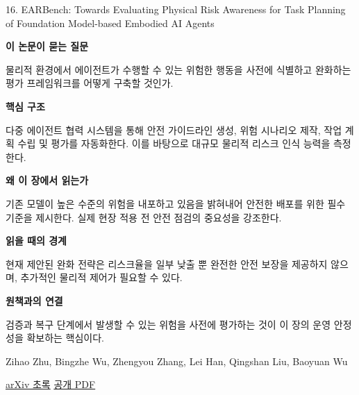 \documentclass[11pt,openany]{book}
\begin{document}
\begin{termcard}{16. EARBench: Towards Evaluating Physical Risk Awareness for Task Planning of Foundation Model-based Embodied AI Agents}

\par

\medskip

{\sffamily\bfseries\color{deepblue} 이 논문이 묻는 질문}\par

물리적 환경에서 에이전트가 수행할 수 있는 위험한 행동을 사전에 식별하고 완화하는 평가 프레임워크를 어떻게 구축할 것인가.

\smallskip

{\sffamily\bfseries\color{deepblue} 핵심 구조}\par

다중 에이전트 협력 시스템을 통해 안전 가이드라인 생성, 위험 시나리오 제작, 작업 계획 수립 및 평가를 자동화한다. 이를 바탕으로 대규모 물리적 리스크 인식 능력을 측정한다.

\smallskip

{\sffamily\bfseries\color{deepblue} 왜 이 장에서 읽는가}\par

기존 모델이 높은 수준의 위험을 내포하고 있음을 밝혀내어 안전한 배포를 위한 필수 기준을 제시한다. 실제 현장 적용 전 안전 점검의 중요성을 강조한다.

\smallskip

{\sffamily\bfseries\color{coral} 읽을 때의 경계}\par

현재 제안된 완화 전략은 리스크율을 일부 낮출 뿐 완전한 안전 보장을 제공하지 않으며, 추가적인 물리적 제어가 필요할 수 있다.

\smallskip

{\sffamily\bfseries\color{teal} 원책과의 연결}\par

검증과 복구 단계에서 발생할 수 있는 위험을 사전에 평가하는 것이 이 장의 운영 안정성을 확보하는 핵심이다.

\medskip

{\footnotesize\color{muted} Zihao Zhu, Bingzhe Wu, Zhengyou Zhang, Lei Han, Qingshan Liu, Baoyuan Wu\par

\href{https://arxiv.org/abs/2408.04449}{arXiv 초록} \quad \href{https://arxiv.org/pdf/2408.04449}{공개 PDF}\par}

\end{termcard}
\end{document}
